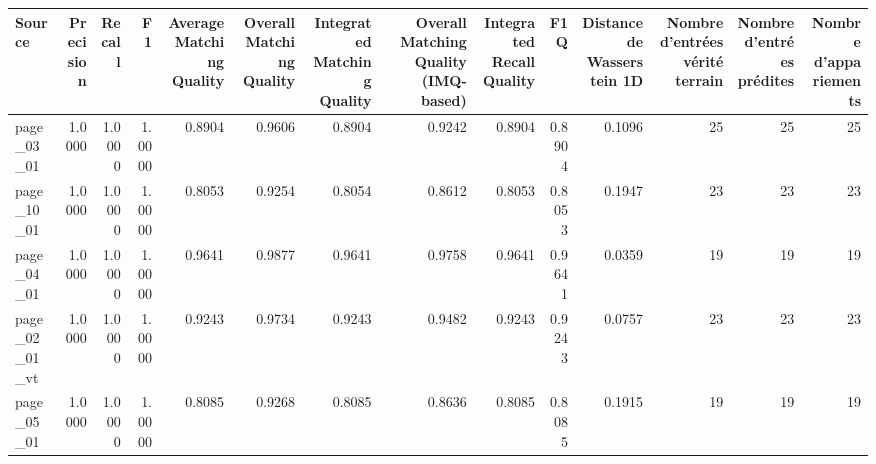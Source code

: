 \begin{tabular}{lrrrrrrrrrrrrr}
\toprule
Source & Precision & Recall & F1 & Average Matching Quality & Overall Matching Quality & Integrated Matching Quality & Overall Matching Quality (IMQ-based) & Integrated Recall Quality & F1Q & Distance de Wasserstein 1D & Nombre d'entrées vérité terrain & Nombre d'entrées prédites & Nombre d'appariements \\
\midrule
page\_03\_01 & 1.0000 & 1.0000 & 1.0000 & 0.8904 & 0.9606 & 0.8904 & 0.9242 & 0.8904 & 0.8904 & 0.1096 & 25 & 25 & 25 \\
page\_10\_01 & 1.0000 & 1.0000 & 1.0000 & 0.8053 & 0.9254 & 0.8054 & 0.8612 & 0.8053 & 0.8053 & 0.1947 & 23 & 23 & 23 \\
page\_04\_01 & 1.0000 & 1.0000 & 1.0000 & 0.9641 & 0.9877 & 0.9641 & 0.9758 & 0.9641 & 0.9641 & 0.0359 & 19 & 19 & 19 \\
page\_02\_01\_vt & 1.0000 & 1.0000 & 1.0000 & 0.9243 & 0.9734 & 0.9243 & 0.9482 & 0.9243 & 0.9243 & 0.0757 & 23 & 23 & 23 \\
page\_05\_01 & 1.0000 & 1.0000 & 1.0000 & 0.8085 & 0.9268 & 0.8085 & 0.8636 & 0.8085 & 0.8085 & 0.1915 & 19 & 19 & 19 \\
\bottomrule
\end{tabular}
